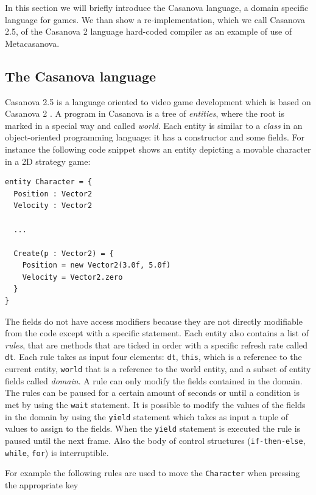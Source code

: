 In this section we will briefly introduce the Casanova language, a domain specific language for games. We than show a re-implementation, which we call Casanova 2.5, of the Casanova 2 language hard-coded compiler as an example of use of Metacasanova.

\subsection{The Casanova language}
Casanova 2.5 is a language oriented to video game development which is based on Casanova 2 \cite{CASANOVA2_PAPER}. A program in Casanova is a tree of \textit{entities}, where the root is marked in a special way and called \textit{world}. Each entity is similar to a \textit{class} in an object-oriented programming language: it has a constructor and some fields. For instance the following code snippet shows an entity depicting a movable character in a 2D strategy game:

\begin{lstlisting}
entity Character = {
  Position : Vector2
  Velocity : Vector2
  
  ...
  
  Create(p : Vector2) = {
    Position = new Vector2(3.0f, 5.0f)
    Velocity = Vector2.zero
  }  
}
\end{lstlisting}

The fields do not have access modifiers because they are not directly modifiable from the code except with a specific statement. Each entity also contains a list of \textit{rules}, that are methods that are ticked in order with a specific refresh rate called \texttt{dt}. Each rule takes as input four elements: \texttt{dt}, \texttt{this}, which is a reference to the current entity, \texttt{world} that is a reference to the world entity, and a subset of entity fields called \textit{domain}. A rule can only modify the fields contained in the domain. The rules can be paused for a certain amount of seconds or until a condition is met by using the \texttt{wait} statement. It is possible to modify the values of the fields in the domain by using the \texttt{yield} statement which takes as input a tuple of values to assign to the fields. When the \texttt{yield} statement is executed the rule is paused until the next frame. Also the body of control structures (\texttt{if-then-else}, \texttt{while}, \texttt{for}) is interruptible.

For example the following rules are used to move the \texttt{Character} when pressing the appropriate key

